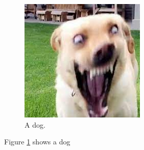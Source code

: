 \documentclass{article}
\begin{document}
		\begin{figure}
			\includegraphics[width=\linewidth]{dog.jpg}
			\caption{A dog.}
			\label{fig:dog}
		\end{figure}
	Figure \ref{fig:dog} shows a dog
	
\end{document}
